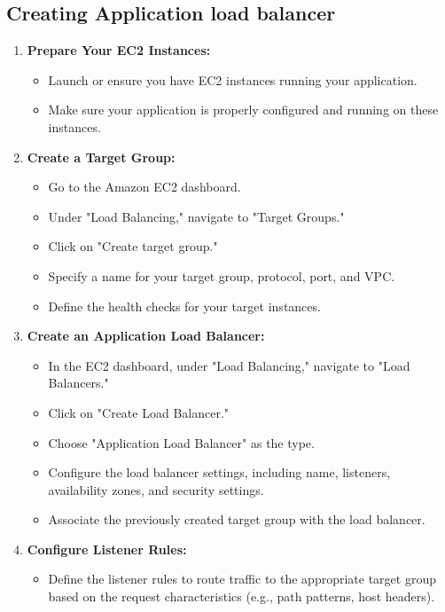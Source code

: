 \documentclass[11pt]{article}
\begin{document}
\subsection{Creating Application load balancer}
\begin{enumerate}
    \item \textbf{Prepare Your EC2 Instances:}
          \begin{itemize}
              \item Launch or ensure you have EC2 instances running your application.
              \item Make sure your application is properly configured and running on these instances.
          \end{itemize}

    \item \textbf{Create a Target Group:}
          \begin{itemize}
              \item Go to the Amazon EC2 dashboard.
              \item Under "Load Balancing," navigate to "Target Groups."
              \item Click on "Create target group."
              \item Specify a name for your target group, protocol, port, and VPC.
              \item Define the health checks for your target instances.
          \end{itemize}

    \item \textbf{Create an Application Load Balancer:}
          \begin{itemize}
              \item In the EC2 dashboard, under "Load Balancing," navigate to "Load Balancers."
              \item Click on "Create Load Balancer."
              \item Choose "Application Load Balancer" as the type.
              \item Configure the load balancer settings, including name, listeners, availability zones, and security settings.
              \item Associate the previously created target group with the load balancer.
          \end{itemize}

    \item \textbf{Configure Listener Rules:}
          \begin{itemize}
              \item Define the listener rules to route traffic to the appropriate target group based on the request characteristics (e.g., path patterns, host headers).
          \end{itemize}


\end{enumerate}
\end{document}

